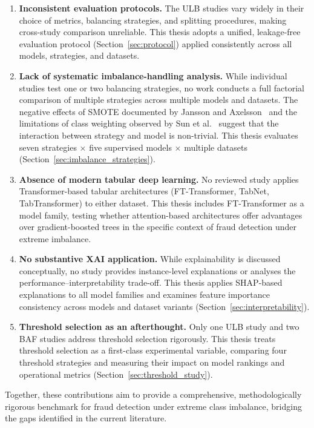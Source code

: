 \begin{enumerate}
    \item \textbf{Inconsistent evaluation protocols.} The ULB studies vary widely in their choice of metrics, balancing strategies, and splitting procedures, making cross-study comparison unreliable. This thesis adopts a unified, leakage-free evaluation protocol (Section~\ref{sec:protocol}) applied consistently across all models, strategies, and datasets.

    \item \textbf{Lack of systematic imbalance-handling analysis.} While individual studies test one or two balancing strategies, no work conducts a full factorial comparison of multiple strategies across multiple models and datasets. The negative effects of SMOTE documented by Jansson and Axelsson~\cite{jansson2020federated} and the limitations of class weighting observed by Sun et al.~\cite{sun2025objective} suggest that the interaction between strategy and model is non-trivial. This thesis evaluates seven strategies $\times$ five supervised models $\times$ multiple datasets (Section~\ref{sec:imbalance_strategies}).

    \item \textbf{Absence of modern tabular deep learning.} No reviewed study applies Transformer-based tabular architectures (FT-Transformer, TabNet, TabTransformer) to either dataset. This thesis includes FT-Transformer as a model family, testing whether attention-based architectures offer advantages over gradient-boosted trees in the specific context of fraud detection under extreme imbalance.

    \item \textbf{No substantive XAI application.} While explainability is discussed conceptually, no study provides instance-level explanations or analyses the performance--interpretability trade-off. This thesis applies SHAP-based explanations to all model families and examines feature importance consistency across models and dataset variants (Section~\ref{sec:interpretability}).

    \item \textbf{Threshold selection as an afterthought.} Only one ULB study and two BAF studies address threshold selection rigorously. This thesis treats threshold selection as a first-class experimental variable, comparing four threshold strategies and measuring their impact on model rankings and operational metrics (Section~\ref{sec:threshold_study}).
\end{enumerate}

Together, these contributions aim to provide a comprehensive, methodologically rigorous benchmark for fraud detection under extreme class imbalance, bridging the gaps identified in the current literature.
